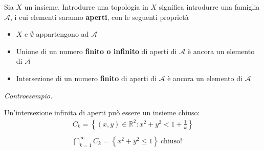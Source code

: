 \documentclass[10pt,a4paper,twoside,openright]{book}
\begin{document}
Sia $X$ un insieme. Introdurre una topologia in $X$ significa introdurre una famiglia $\mathcal{A}$, i cui elementi saranno \textbf{aperti}, con le seguenti proprietà
\begin{itemize}
\item $X$ e $\emptyset $ appartengono ad $\mathcal{A}$
\item Unione di un numero \textbf{finito o infinito} di aperti di $\mathcal{A}$ è ancora un elemento di $\mathcal{A}$
\item Intersezione di un numero \textbf{finito} di aperti di $\mathcal{A}$ è ancora un elemento di $\mathcal{A}$
\end{itemize}



\textit{Controesempio. }

Un'intersezione infinita di aperti può essere un insieme chiuso:
\begin{gather*}
C_{k} =\left\{(x,y) \in \mathbb{R}^{2} :x^{2} +y^{2} < 1+\frac{1}{k}\right\}\\
\\
\bigcap\limits ^{\infty }_{k=1} C_{k} =\left\{x^{2} +y^{2} \leqslant 1\right\} \ \text{chiuso!}
\end{gather*}
\end{document}

